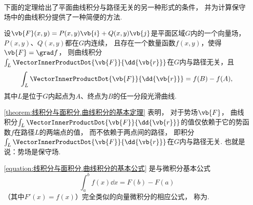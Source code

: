 下面的定理给出了平面曲线积分与路径无关的另一种形式的条件，
并为计算保守场中的曲线积分提供了一种简便的方法.
\begin{theorem}[曲线积分的基本定理]\label{theorem:线积分与面积分.曲线积分的基本定理}
设\(\vb{F}(x,y)=P(x,y)\vb{i}+Q(x,y)\vb{j}\)是平面区域\(G\)内的一个向量场，
\(P(x,y)\)、\(Q(x,y)\)都在\(G\)内连续，
且存在一个数量函数\(f(x,y)\)，使得\(\vb{F}=\grad f\)，
则曲线积分\(\int_L \VectorInnerProductDot{\vb{F}}{\dd{\vb{r}}}\)在\(G\)内与路径无关，且
\begin{equation}\label{equation:线积分与面积分.曲线积分的基本公式}
	\int_L \VectorInnerProductDot{\vb{F}}{\dd{\vb{r}}}
	= f(B)-f(A),
\end{equation}
其中\(L\)是位于\(G\)内起点为\(A\)、终点为\(B\)的任一分段光滑曲线.
\end{theorem}

\cref{theorem:线积分与面积分.曲线积分的基本定理} 表明，
对于势场\(\vb{F}\)，
曲线积分\(\int_L \VectorInnerProductDot{\vb{F}}{\dd{\vb{r}}}\)的值仅依赖于它的势函数\(f\)在路径\(L\)的两端点的值，
而不依赖于两点间的路径，
即积分\(\int_L \VectorInnerProductDot{\vb{F}}{\dd{\vb{r}}}\)在\(G\)内与路径无关.
也就是说：势场是保守场.

\cref{equation:线积分与面积分.曲线积分的基本公式}
是与微积分基本公式\begin{equation*}
	\int_a^b f(x) \dd{x}
	= F(b) - F(a)
\end{equation*}
（其中\(F'(x) = f(x)\)）完全类似的向量微积分的相应公式，
称为.
